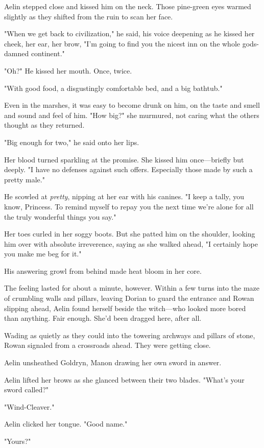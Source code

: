 Aelin stepped close and kissed him on the neck.
Those pine-green eyes warmed slightly as they shifted from the ruin to scan her face.

"When we get back to civilization," he said, his voice deepening as he kissed her cheek, her ear, her brow, "I'm going to find you the nicest inn on the whole gods-damned continent."

"Oh?"
He kissed her mouth.
Once, twice.

"With good food, a disgustingly comfortable bed, and a big bathtub."

Even in the marshes, it was easy to become drunk on him, on the taste and smell and sound and feel of him.
"How big?"
she murmured, not caring what the others thought as they returned.

"Big enough for two," he said onto her lips.

Her blood turned sparkling at the promise.
She kissed him once---briefly but deeply.
"I have no defenses against such offers.
Especially those made by such a pretty male."

He scowled at \emph{pretty}, nipping at her ear with his canines.
"I keep a tally, you know, Princess.
To remind myself to repay you the next time we're alone for all the truly wonderful things you say."

Her toes curled in her soggy boots.
But she patted him on the shoulder, looking him over with absolute irreverence, saying as she walked ahead, "I certainly hope you make me beg for it."

His answering growl from behind made heat bloom in her core.

The feeling lasted for about a minute, however.
Within a few turns into the maze of crumbling walls and pillars, leaving Dorian to guard the entrance and Rowan slipping ahead, Aelin found herself beside the witch---who looked more bored than anything.
Fair enough.
She'd been dragged here, after all.

Wading as quietly as they could into the towering archways and pillars of stone, Rowan signaled from a crossroads ahead.
They were getting close.

Aelin unsheathed Goldryn, Manon drawing her own sword in answer.

Aelin lifted her brows as she glanced between their two blades.
"What's your sword called?"

"Wind-Cleaver."

Aelin clicked her tongue.
"Good name."

"Yours?"

